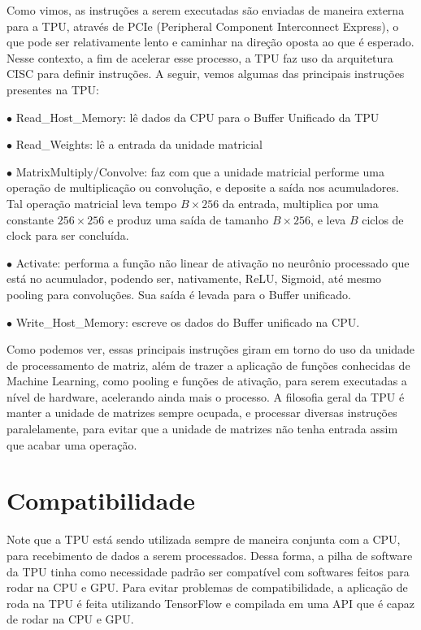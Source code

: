 \documentclass{report}
\begin{document}
\setlength{\parskip}{1em}\hspace{0.5cm} Como vimos, as instruções a serem executadas são enviadas de maneira externa para a TPU, através de PCIe (Peripheral Component Interconnect Express), o que pode ser relativamente lento e caminhar na direção oposta ao que é esperado. Nesse contexto, a fim de acelerar esse processo, a TPU faz uso da arquitetura CISC para definir instruções. A seguir, vemos algumas das principais instruções presentes na TPU:

$\bullet$ Read\_Host\_Memory: lê dados da CPU para o Buffer Unificado da TPU

$\bullet$ Read\_Weights: lê a entrada da unidade matricial

$\bullet$ MatrixMultiply/Convolve: faz com que a unidade matricial performe uma operação de multiplicação ou convolução, e deposite a saída nos acumuladores. Tal operação matricial leva tempo $B \times 256$ da entrada, multiplica por uma constante $256 \times 256$ e produz uma saída de tamanho $B \times 256$, e leva $B$ ciclos de clock para ser concluída.

$\bullet$ Activate: performa a função não linear de ativação no neurônio processado que está no acumulador, podendo ser, nativamente, ReLU, Sigmoid, até mesmo pooling para convoluções. Sua saída é levada para o Buffer unificado.

$\bullet$ Write\_Host\_Memory: escreve os dados do Buffer unificado na CPU.

Como podemos ver, essas principais instruções giram em torno do uso da unidade de processamento de matriz, além de trazer a aplicação de funções conhecidas de Machine Learning, como pooling e funções de ativação, para serem executadas a nível de hardware, acelerando ainda mais o processo. A filosofia geral da TPU é manter a unidade de matrizes sempre ocupada, e processar diversas instruções paralelamente, para evitar que a unidade de matrizes não tenha entrada assim que acabar uma operação.

\section{Compatibilidade}

\setlength{\parskip}{1em}\hspace{0.5cm} Note que a TPU está sendo utilizada sempre de maneira conjunta com a CPU, para recebimento de dados a serem processados. Dessa forma, a pilha de software da TPU tinha como necessidade padrão ser compatível com softwares feitos para rodar na CPU e GPU. Para evitar problemas de compatibilidade, a aplicação de roda na TPU é feita utilizando TensorFlow e compilada em uma API que é capaz de rodar na CPU e GPU.
\end{document}
